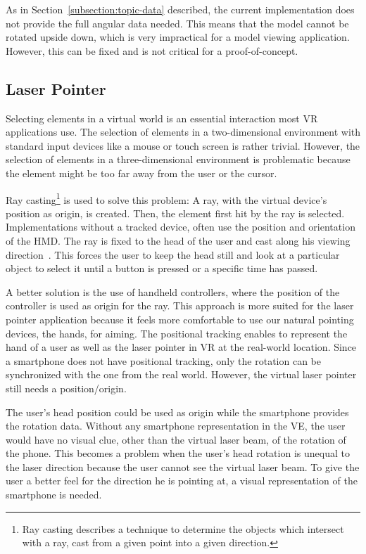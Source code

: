 As in Section~\ref{subsection:topic-data} described, the current implementation does not provide the full angular data needed. This means that the model cannot be rotated upside down, which is very impractical for a model viewing application. However, this can be fixed and is not critical for a proof-of-concept.


\subsection{Laser Pointer}\label{subsection:laser-pointer}

Selecting elements in a virtual world is an essential interaction most \gls{VR} applications use. The selection of elements in a two-dimensional environment with standard input devices like a mouse or touch screen is rather trivial. However, the selection of elements in a three-dimensional environment is problematic because the element might be too far away from the user or the cursor.

Ray casting\footnote{Ray casting describes a technique to determine the objects which intersect with a ray, cast from a given point into a given direction.} is used to solve this problem: A ray, with the virtual device's position as origin, is created. Then, the element first hit by the ray is selected. Implementations without a tracked device, often use the position and orientation of the \gls{HMD}. The ray is fixed to the head of the user and cast along his viewing direction~\cite[23]{Kamm.2018}. This forces the user to keep the head still and look at a particular object to select it until a button is pressed or a specific time has passed.

A better solution is the use of handheld controllers, where the position of the controller is used as origin for the ray. This approach is more suited for the laser pointer application because it feels more comfortable to use our natural pointing devices, the hands, for aiming. The positional tracking enables to represent the hand of a user as well as the laser pointer in \gls{VR} at the real-world location. Since a smartphone does not have positional tracking, only the rotation can be synchronized with the one from the real world. However, the virtual laser pointer still needs a position/origin.

The user's head position could be used as origin while the smartphone provides the rotation data. Without any smartphone representation in the \gls{VE}, the user would have no visual clue, other than the virtual laser beam, of the rotation of the phone. This becomes a problem when the user's head rotation is unequal to the laser direction because the user cannot see the virtual laser beam. To give the user a better feel for the direction he is pointing at, a visual representation of the smartphone is needed.

